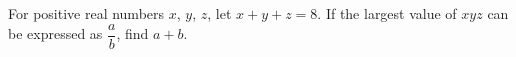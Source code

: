 For positive real numbers $x$, $y$, $z$, let $x + y + z = 8$. If the largest value of $xyz$ can be expressed as $\dfrac{a}{b}$, find $a + b$.
